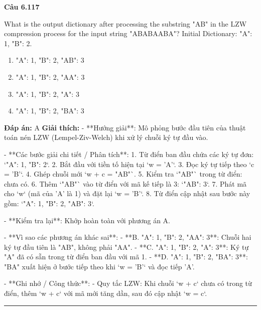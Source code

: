 \documentclass[11pt,a4paper]{article}
\newenvironment{question}[1]{%
  \par\vspace{1em}\noindent\textbf{\large Câu #1}\par\vspace{0.4em}
}{%
  \par\vspace{1em}\hrule\vspace{0.6em}
}
\newenvironment{choices}{%
  \begin{enumerate}[label=\textbf{\Alph*.},leftmargin=2.2em,itemsep=2pt,topsep=3pt]
}{%
  \end{enumerate}
}
\newcommand{\choice}{\item}
\begin{document}
\begin{question}{6.117}
What is the output dictionary after processing the substring "AB" in the LZW compression process for the input string "ABABAABA"?
Initial Dictionary: {"A": 1, "B": 2}.
\begin{choices}
\choice {"A": 1, "B": 2, "AB": 3}
\choice {"A": 1, "B": 2, "AA": 3}
\choice {"A": 1, "B": 2, "A": 3}
\choice {"A": 1, "B": 2, "BA": 3}
\end{choices}
\textbf{Đáp án:} A
\textbf{Giải thích:} - **Hướng giải**:
  Mô phỏng bước đầu tiên của thuật toán nén LZW (Lempel-Ziv-Welch) khi xử lý chuỗi ký tự đầu vào.

- **Các bước giải chi tiết / Phân tích**:
  1. Từ điển ban đầu chứa các ký tự đơn: `{"A": 1, "B": 2}`.
  2. Bắt đầu với tiền tố hiện tại `w = 'A'`.
  3. Đọc ký tự tiếp theo `c = 'B'`.
  4. Ghép chuỗi mới `w + c = "AB"`.
  5. Kiểm tra `"AB"` trong từ điển: chưa có.
  6. Thêm `"AB"` vào từ điển với mã kế tiếp là 3: `"AB": 3`.
  7. Phát mã cho `w` (mã của 'A' là 1) và đặt lại `w = 'B'`.
  8. Từ điển cập nhật sau bước này gồm: `{"A": 1, "B": 2, "AB": 3}`.

- **Kiểm tra lại**:
  Khớp hoàn toàn với phương án A.

- **Vì sao các phương án khác sai**:
  - **B. {"A": 1, "B": 2, "AA": 3}**: Chuỗi hai ký tự đầu tiên là "AB", không phải "AA".
  - **C. {"A": 1, "B": 2, "A": 3}**: Ký tự "A" đã có sẵn trong từ điển ban đầu với mã 1.
  - **D. {"A": 1, "B": 2, "BA": 3}**: "BA" xuất hiện ở bước tiếp theo khi `w = 'B'` và đọc tiếp 'A'.

- **Ghi nhớ / Công thức**:
  - Quy tắc LZW: Khi chuỗi `w + c` chưa có trong từ điển, thêm `w + c` với mã mới tăng dần, sau đó cập nhật `w = c`.
\end{question}
\end{document}
